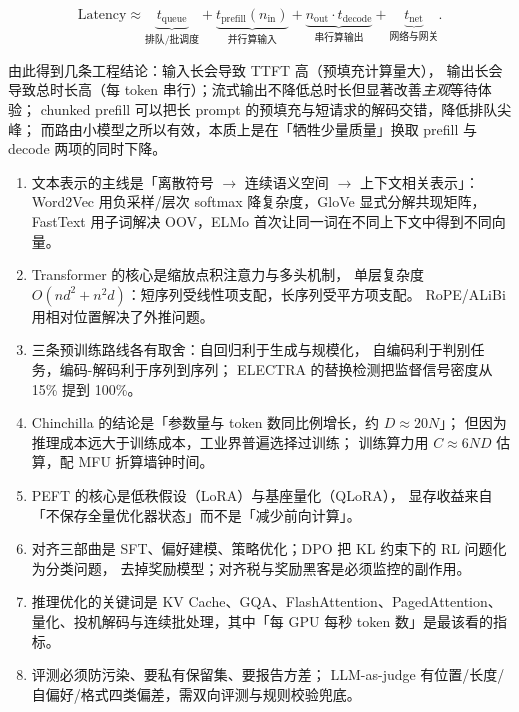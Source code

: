 $$\text{Latency} \approx \underbrace{t_{\text{queue}}}_{\text{排队/批调度}} +
\underbrace{t_{\text{prefill}}(n_{\text{in}})}_{\text{并行算输入}} +
\underbrace{n_{\text{out}} \cdot t_{\text{decode}}}_{\text{串行算输出}} + \underbrace{t_{\text{net}}}_{\text{网络与网关}} .$$

由此得到几条工程结论：输入长会导致 TTFT 高（预填充计算量大），
输出长会导致总时长高（每 token 串行）；流式输出不降低总时长但显著改善\emph{主观}等待体验；
chunked prefill 可以把长 prompt 的预填充与短请求的解码交错，降低排队尖峰；
而路由小模型之所以有效，本质上是在「牺牲少量质量」换取 prefill 与 decode 两项的同时下降。

\begin{keypoint}[本章要点回顾]
\begin{enumerate}
  \item 文本表示的主线是「离散符号 $\to$ 连续语义空间 $\to$ 上下文相关表示」：
        Word2Vec 用负采样/层次 softmax 降复杂度，GloVe 显式分解共现矩阵，
        FastText 用子词解决 OOV，ELMo 首次让同一词在不同上下文中得到不同向量。
  \item Transformer 的核心是缩放点积注意力与多头机制，
        单层复杂度 $O(nd^2 + n^2d)$：短序列受线性项支配，长序列受平方项支配。
        RoPE/ALiBi 用相对位置解决了外推问题。
  \item 三条预训练路线各有取舍：自回归利于生成与规模化，
        自编码利于判别任务，编码-解码利于序列到序列；
        ELECTRA 的替换检测把监督信号密度从 15\% 提到 100\%。
  \item Chinchilla 的结论是「参数量与 token 数同比例增长，约 $D \approx 20N$」；
        但因为推理成本远大于训练成本，工业界普遍选择过训练；
        训练算力用 $C \approx 6ND$ 估算，配 MFU 折算墙钟时间。
  \item PEFT 的核心是低秩假设（LoRA）与基座量化（QLoRA），
        显存收益来自「不保存全量优化器状态」而不是「减少前向计算」。
  \item 对齐三部曲是 SFT、偏好建模、策略优化；DPO 把 KL 约束下的 RL 问题化为分类问题，
        去掉奖励模型；对齐税与奖励黑客是必须监控的副作用。
  \item 推理优化的关键词是 KV Cache、GQA、FlashAttention、PagedAttention、
        量化、投机解码与连续批处理，其中「每 GPU 每秒 token 数」是最该看的指标。
  \item 评测必须防污染、要私有保留集、要报告方差；
        LLM-as-judge 有位置/长度/自偏好/格式四类偏差，需双向评测与规则校验兜底。
\end{enumerate}
\end{keypoint}

